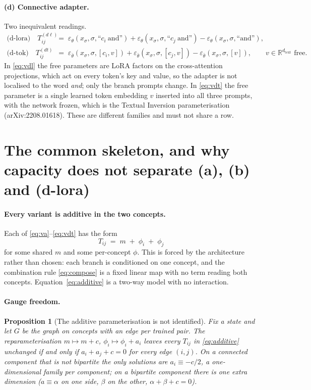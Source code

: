 \documentclass[11pt]{article}
\newcommand{\eps}{\varepsilon}
\newcommand{\epsth}{\eps_\theta}
\newcommand{\epsfr}{\eps_{\bar\theta}}
\newcommand{\xs}{x_\sigma}
\newcommand{\R}{\mathbb{R}}
\theoremstyle{plain}
\newtheorem{proposition}{Proposition}
\theoremstyle{remark}
\begin{document}
\paragraph{(d) Connective adapter.} Two inequivalent readings.
\begin{align}
  \text{(d-lora)}\quad
  T^{(d\ell)}_{ij} &\;=\; \epsth(\xs,\sigma,\text{``}c_i\ \mathrm{and}\text{''})
  + \epsth(\xs,\sigma,\text{``}c_j\ \mathrm{and}\text{''})
  - \epsth(\xs,\sigma,\text{``and''}),
  \label{eq:vdl}\\[2pt]
  \text{(d-tok)}\quad
  T^{(dt)}_{ij} &\;=\; \epsfr(\xs,\sigma,[c_i, v]) + \epsfr(\xs,\sigma,[c_j, v])
  - \epsfr(\xs,\sigma,[v]),
  \qquad v \in \R^{d_{\mathrm{text}}} \text{ free}.
  \label{eq:vdt}
\end{align}
In \eqref{eq:vdl} the free parameters are LoRA factors on the cross-attention projections,
which act on every token's key and value, so the adapter is not localised to the word
\emph{and}; only the branch prompts change. In \eqref{eq:vdt} the free parameter is a single
learned token embedding $v$ inserted into all three prompts, with the network frozen, which is
the Textual Inversion parameterisation (arXiv:2208.01618). These are different families and
must not share a row.

\section{The common skeleton, and why capacity does not separate (a), (b) and (d-lora)}

\paragraph{Every variant is additive in the two concepts.}
Each of \eqref{eq:va}--\eqref{eq:vdt} has the form
\begin{equation}
  T_{ij} \;=\; m \;+\; \phi_i \;+\; \phi_j
  \label{eq:additive}
\end{equation}
for some shared $m$ and some per-concept $\phi$. This is forced by the architecture rather than
chosen: each branch is conditioned on one concept, and the combination rule \eqref{eq:compose}
is a fixed linear map with no term reading both concepts. Equation~\eqref{eq:additive} is a
two-way model with no interaction.

\paragraph{Gauge freedom.}
\begin{proposition}[The additive parameterisation is not identified]
\label{prop:gauge}
Fix a state and let $G$ be the graph on concepts with an edge per trained pair. The
reparameterisation $m \mapsto m + c$, $\phi_i \mapsto \phi_i + a_i$ leaves every $T_{ij}$ in
\eqref{eq:additive} unchanged if and only if $a_i + a_j + c = 0$ for every edge $(i,j)$. On a
connected component that is not bipartite the only solutions are $a_i \equiv -c/2$, a
one-dimensional family per component; on a bipartite component there is one extra dimension
($a \equiv \alpha$ on one side, $\beta$ on the other, $\alpha + \beta + c = 0$).
\end{proposition}
\end{document}
